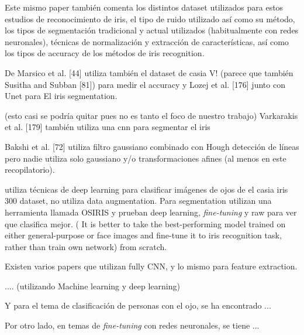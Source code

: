  Este mismo paper también comenta los distintos dataset utilizados para estos estudios de reconocimiento de iris, el tipo de ruido utilizado así como su método,
 los tipos de segmentación tradicional y actual utilizados (habitualmente con redes neuronales), técnicas de normalización y extracción de características, así 
 como los tipos de accuracy de los métodos de iris recognition.

 De Marsico et al. [44] utiliza también el dataset de casia V! (parece que también Susitha and Subban [81]) para medir el accuracy y Lozej et al. [176] junto con Unet para El
 iris segmentation.

(esto casi se podría quitar pues no es tanto el foco de nuestro trabajo) Varkarakis et al. [179] también utiliza una cnn para segmentar el iris

 Bakshi et al. [72] utiliza filtro gaussiano combinado con Hough detección de líneas pero nadie utiliza solo gaussiano y/o transformaciones afines (al menos en este
 recopilatorio).

 \cite{boyd_deep_2020} utiliza técnicas de deep learning para clasificar imágenes de ojos de el casia iris 300 dataset, no utiliza data augmentation. Para segmentation utilizan una herramienta
 llamada OSIRIS y prueban deep learning, \textit{fine-tuning} y raw para ver que clasifica mejor. ( It is better to take the best-performing model trained on either general-purpose or face images and
  fine-tune it to iris recognition task, rather than train own network)
 from scratch.
 

 Existen varios papers que utilizan fully CNN, y lo mismo para feature extraction.



.... (utilizando Machine learning y deep learning)

Y para el tema de clasificación de personas con el ojo, se ha encontrado ...

Por otro lado, en temas de \textit{fine-tuning} con redes neuronales, se tiene ...